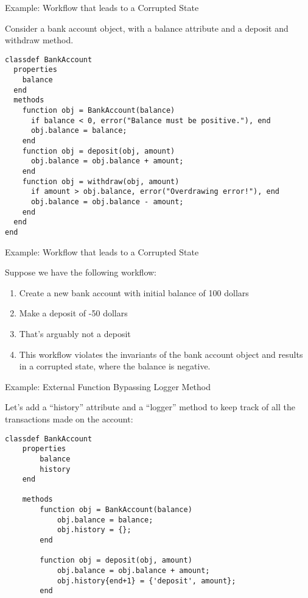 \documentclass[handout]{beamer}
\begin{document}
\begin{frame}[fragile]{Example: Workflow that leads to a Corrupted State}

Consider a bank account object, with a balance attribute and a deposit and withdraw method.

\begin{lstlisting}[style=MATLAB]
classdef BankAccount
  properties
    balance
  end
  methods
    function obj = BankAccount(balance)
      if balance < 0, error("Balance must be positive."), end
      obj.balance = balance;
    end
    function obj = deposit(obj, amount)
      obj.balance = obj.balance + amount;
    end
    function obj = withdraw(obj, amount)
      if amount > obj.balance, error("Overdrawing error!"), end
      obj.balance = obj.balance - amount;
    end
  end
end
\end{lstlisting}

\end{frame}

\begin{frame}[fragile]{Example: Workflow that leads to a Corrupted State}
        
    Suppose we have the following workflow:
    
    \begin{enumerate}
        \item Create a new bank account with initial balance of 100 dollars
        \item Make a deposit of -50 dollars
        \item That's arguably not a deposit
        \item This workflow violates the invariants of the bank account object and results in a corrupted state, where the balance is negative.
    \end{enumerate}
    
\end{frame}


\begin{frame}[fragile]{Example: External Function Bypassing Logger Method}
    
    Let's add a ``history'' attribute and a ``logger'' method to keep track of all the transactions made on the account:
    
    \begin{lstlisting}[style=Matlab]
classdef BankAccount
    properties
        balance
        history
    end
    
    methods
        function obj = BankAccount(balance)
            obj.balance = balance;
            obj.history = {};
        end
        
        function obj = deposit(obj, amount)
            obj.balance = obj.balance + amount;
            obj.history{end+1} = {'deposit', amount};
        end
    \end{lstlisting}
    
\end{frame}
        
\end{document}
